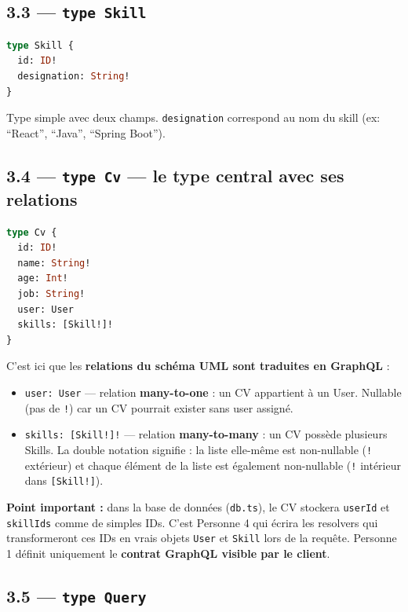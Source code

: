 \documentclass[12pt,a4paper]{article}
\begin{document}
\subsection{3.3 --- \texttt{type Skill}}

\begin{lstlisting}[language=GraphQL, caption={Type Skill}]
type Skill {
  id: ID!
  designation: String!
}
\end{lstlisting}

Type simple avec deux champs. \texttt{designation} correspond au nom du skill (ex: ``React'', ``Java'', ``Spring Boot'').

\subsection{3.4 --- \texttt{type Cv} --- le type central avec ses relations}

\begin{lstlisting}[language=GraphQL, caption={Type Cv avec relations}]
type Cv {
  id: ID!
  name: String!
  age: Int!
  job: String!
  user: User
  skills: [Skill!]!
}
\end{lstlisting}

C'est ici que les \textbf{relations du schéma UML sont traduites en GraphQL} :

\begin{itemize}
  \item \texttt{user: User} --- relation \textbf{many-to-one} : un CV appartient à un User. Nullable (pas de \texttt{!}) car un CV pourrait exister sans user assigné.
  \item \texttt{skills: [Skill!]!} --- relation \textbf{many-to-many} : un CV possède plusieurs Skills. La double notation signifie : la liste elle-même est non-nullable (\texttt{!} extérieur) et chaque élément de la liste est également non-nullable (\texttt{!} intérieur dans \texttt{[Skill!]}).
\end{itemize}

\textbf{Point important :} dans la base de données (\texttt{db.ts}), le CV stockera \texttt{userId} et \texttt{skillIds} comme de simples IDs. C'est Personne 4 qui écrira les resolvers qui transformeront ces IDs en vrais objets \texttt{User} et \texttt{Skill} lors de la requête. Personne 1 définit uniquement le \textbf{contrat GraphQL visible par le client}.

\subsection{3.5 --- \texttt{type Query}}
\end{document}
